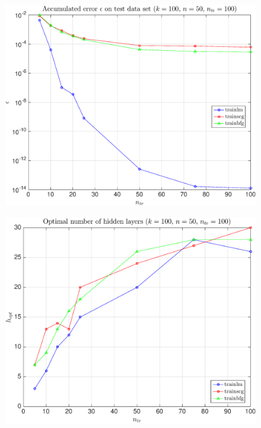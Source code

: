 \documentclass[11pt,a4paper]{article}
\theoremstyle{definition}
\theoremstyle{theorem}
\numberwithin{equation}{section}
\begin{document}
	\begin{figure}[H]
		\center
		\includegraphics[scale = 0.5]{fig24}
		\caption{}
	\end{figure}
	
	\begin{figure}[H]
		\center
		\includegraphics[scale = 0.5]{fig25}
		\caption{}
	\end{figure}
	
\end{document}
